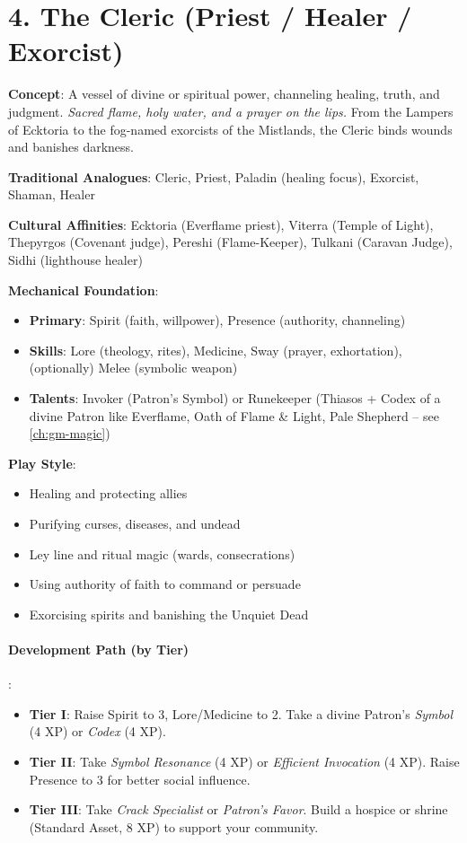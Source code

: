 \section{4. The Cleric (Priest / Healer / Exorcist)}
\label{sec:concept-cleric}

\textbf{Concept}: A vessel of divine or spiritual power, channeling healing, truth, and judgment. \emph{Sacred flame, holy water, and a prayer on the lips.} From the Lampers of Ecktoria to the fog-named exorcists of the Mistlands, the Cleric binds wounds and banishes darkness.

\textbf{Traditional Analogues}: Cleric, Priest, Paladin (healing focus), Exorcist, Shaman, Healer

\textbf{Cultural Affinities}: Ecktoria (Everflame priest), Viterra (Temple of Light), Thepyrgos (Covenant judge), Pereshi (Flame-Keeper), Tulkani (Caravan Judge), Sidhi (lighthouse healer)

\textbf{Mechanical Foundation}:
\begin{itemize}
\item \textbf{Primary}: Spirit (faith, willpower), Presence (authority, channeling)
\item \textbf{Skills}: Lore (theology, rites), Medicine, Sway (prayer, exhortation), (optionally) Melee (symbolic weapon)
\item \textbf{Talents}: Invoker (Patron's Symbol) or Runekeeper (Thiasos + Codex of a divine Patron like Everflame, Oath of Flame \& Light, Pale Shepherd -- see \ref{ch:gm-magic})
\end{itemize}

\textbf{Play Style}:
\begin{itemize}
\item Healing and protecting allies
\item Purifying curses, diseases, and undead
\item Ley line and ritual magic (wards, consecrations)
\item Using authority of faith to command or persuade
\item Exorcising spirits and banishing the Unquiet Dead
\end{itemize}

\paragraph{Development Path (by Tier)}:
\begin{itemize}
\item \textbf{Tier I}: Raise Spirit to 3, Lore/Medicine to 2. Take a divine Patron's \emph{Symbol} (4 XP) or \emph{Codex} (4 XP).
\item \textbf{Tier II}: Take \emph{Symbol Resonance} (4 XP) or \emph{Efficient Invocation} (4 XP). Raise Presence to 3 for better social influence.
\item \textbf{Tier III}: Take \emph{Crack Specialist} or \emph{Patron's Favor}. Build a hospice or shrine (Standard Asset, 8 XP) to support your community.
\end{itemize}

